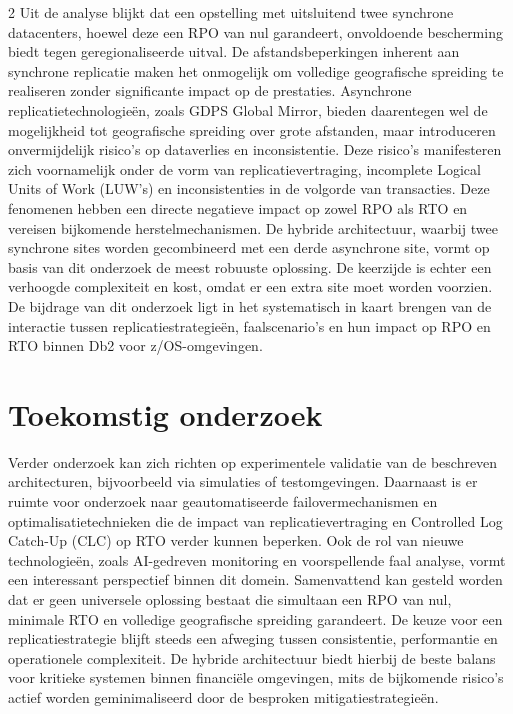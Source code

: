 \documentclass[a0,portrait]{hogent-poster}
\begin{document}
\begin{multicols}{2}
Uit de analyse blijkt dat een opstelling met uitsluitend twee synchrone datacenters, hoewel deze een RPO van nul garandeert, onvoldoende bescherming biedt tegen geregionaliseerde uitval.
De afstandsbeperkingen inherent aan synchrone replicatie maken het onmogelijk om volledige geografische spreiding te realiseren zonder significante impact op de prestaties.
Asynchrone replicatietechnologieën, zoals GDPS Global Mirror, bieden daarentegen wel de mogelijkheid tot geografische spreiding over grote afstanden, maar introduceren onvermijdelijk risico's op dataverlies en inconsistentie. 
Deze risico's manifesteren zich voornamelijk onder de vorm van replicatievertraging, incomplete Logical Units of Work (LUW's) en inconsistenties in de volgorde van transacties. 
Deze fenomenen hebben een directe negatieve impact op zowel RPO als RTO en vereisen bijkomende herstelmechanismen.
De hybride architectuur, waarbij twee synchrone sites worden gecombineerd met een derde asynchrone site, vormt op basis van dit onderzoek de meest robuuste oplossing. 
De keerzijde is echter een verhoogde complexiteit en kost, omdat er een extra site moet worden voorzien.
De bijdrage van dit onderzoek ligt in het systematisch in kaart brengen van de interactie tussen replicatiestrategieën, faalscenario's en hun impact op RPO en RTO binnen Db2 voor z/OS-omgevingen.


\section{Toekomstig onderzoek}

Verder onderzoek kan zich richten op experimentele validatie van de beschreven architecturen, bijvoorbeeld via simulaties of testomgevingen. 
Daarnaast is er ruimte voor onderzoek naar geautomatiseerde failovermechanismen en optimalisatietechnieken die de impact van replicatievertraging en Controlled Log Catch-Up (CLC) op RTO verder kunnen beperken. 
Ook de rol van nieuwe technologieën, zoals AI-gedreven monitoring en voorspellende faal analyse, vormt een interessant perspectief binnen dit domein.
Samenvattend kan gesteld worden dat er geen universele oplossing bestaat die simultaan een RPO van nul, minimale RTO en volledige geografische spreiding garandeert. 
De keuze voor een replicatiestrategie blijft steeds een afweging tussen consistentie, performantie en operationele complexiteit. 
De hybride architectuur biedt hierbij de beste balans voor kritieke systemen binnen financiële omgevingen, mits de bijkomende risico's actief worden geminimaliseerd door de besproken mitigatiestrategieën.

\end{multicols}
\end{document}
